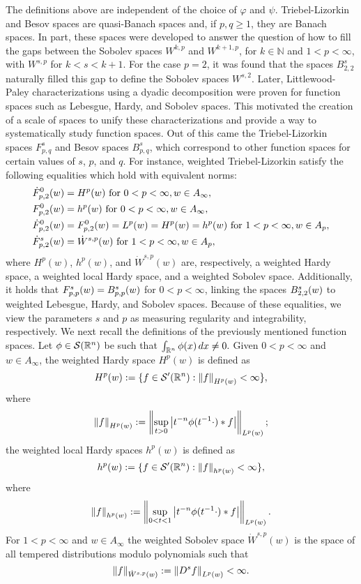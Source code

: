 The definitions above are independent of the choice of $\varphi$ and $\psi$. Triebel-Lizorkin and Besov spaces are quasi-Banach spaces and, if $p,q \geq 1$, they are Banach spaces. In part, these spaces were developed to answer the question of how to fill the gaps between the Sobolev spaces $W^{k,p}$ and $W^{k+1,p}$, for $k\in\mathbb{N}$ and $1<p<\infty$, with $W^{s,p}$ for $k<s<k+1$. For the case $p=2$, it was found that the spaces $B^s_{2,2}$ naturally filled this gap to define the Sobolev spaces $W^{s,2}$. Later, Littlewood-Paley characterizations using a dyadic decomposition were proven for function spaces such as Lebesgue, Hardy, and Sobolev spaces. This motivated the creation of a scale of spaces to unify these characterizations and provide a way to systematically study function spaces. Out of this came the Triebel-Lizorkin spaces $F^s_{p,q}$ and Besov spaces $B^s_{p,q}$, which correspond to other function spaces for certain values of $s$, $p$, and $q$. For instance, weighted Triebel-Lizorkin satisfy the following equalities which hold with equivalent norms: 
\begin{align}
 \tlw{p}{0}{2}{w} &= H^p (w) \text{ for } 0<p<\infty,  w\in A_\infty, \label{TL_equal1} \\
 \itlw{p}{0}{2}{w}&= h^p(w) \text{ for } 0<p<\infty,  w\in A_\infty, \label{TL_equal2}  \\
  \tlw{p}{0}{2}{w} &= \itlw{p}{0}{2}{w} = L^p(w) = H^p(w) = h^p(w) \text{ for } 1<p<\infty,  w\in A_p, \label{TL_equal3} \\
 \tlw{p}{s}{2}{w} &= \dot{W}^{s,p}(w) \text{ for } 1<p<\infty,  w\in A_p,\label{TL_equal4}   
\end{align}
where $H^p(w)$, $h^p (w)$, and $\dot{W}^{s,p}(w)$ are, respectively, a weighted Hardy space, a weighted local Hardy space, and a weighted Sobolev space. Additionally, it holds that $\itlw{p}{s}{p}{w} = \ibesw{p}{s}{p}{w}$ for $0<p<\infty$, linking the spaces $\ibesw{2}{s}{2}{w}$ to weighted Lebesgue, Hardy, and Sobolev spaces. Because of these equalities, we view the parameters $s$ and $p$ as measuring regularity and integrability, respectively. We next recall the definitions of the previously mentioned function spaces.
Let $\phi\in \sw$ be such that $\int_{\rn}\phi(x)\dx\neq 0.$ Given $0<p<\infty$ and $w\in A_\infty$, the weighted Hardy space $H^p(w)$ is defined as 
\begin{equation*}
H^p(w) :=\{f \in \swp: \norm{f}{H^p(w)}< \infty \},
\end{equation*}
where 
\[
\norm{f}{H^p(w)}:= \norm{\sup_{t>0} \abs{t^{-n}\phi(t^{-1}\cdot)\ast f}}{L^p(w)} ;
\]
the weighted local Hardy spaces $h^p(w)$ is defined as
\begin{equation*}\label{def:local_Hardy}
h^p(w) :=\{f \in \swp: \norm{f}{h^p(w)}< \infty \},
\end{equation*}
where 
\[
\norm{f}{h^p(w)}:= \norm{\sup_{0<t<1} \abs{t^{-n}\phi(t^{-1}\cdot)\ast f}}{L^p(w)} .
\]
For $1<p<\infty$ and $w\in A_\infty$ the weighted Sobolev space $\dot{W}^{s,p}(w)$ is the space of all tempered distributions modulo polynomials such that 
\[\norm{f}{\dot{W}^{s,p}(w)} := \norm{D^s f}{L^p(w)} < \infty. \]


